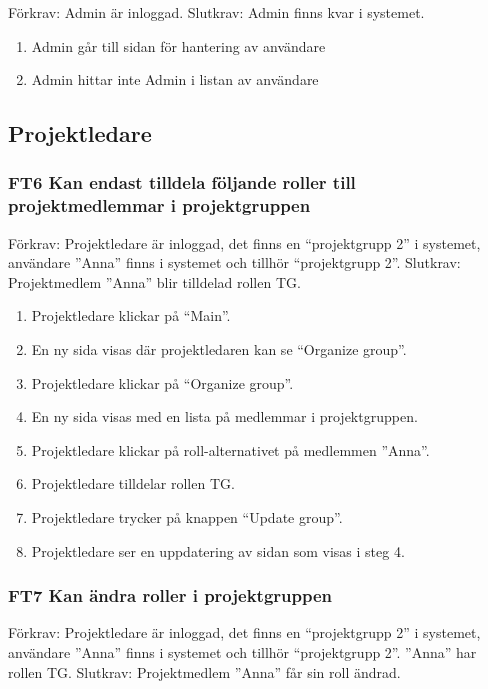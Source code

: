 \documentclass[paper=a4, fontsize=11pt,twoside]{article}
\begin{document}
	Förkrav: Admin är inloggad.
	\newline
	Slutkrav: Admin finns kvar i systemet.
	
	\begin{enumerate}
	\item Admin går till sidan för hantering av användare
 	\item Admin hittar inte Admin i listan av användare
 	\end{enumerate}
	
	
	\subsection{Projektledare}
	
	\subsubsection*{FT6 Kan endast tilldela följande roller till projektmedlemmar i
	projektgruppen }
	
	Förkrav: Projektledare är inloggad, det finns en “projektgrupp 2” i systemet,
	användare  ”Anna” finns i systemet och tillhör “projektgrupp 2”.
	\newline
	Slutkrav: Projektmedlem ”Anna” blir tilldelad  rollen TG.
	
	\begin{enumerate}
	 \item Projektledare klickar på “Main”.
	\item En ny sida visas där projektledaren kan se “Organize group”.
	\item Projektledare klickar på “Organize group”.
	\item En ny sida visas med en lista på medlemmar i projektgruppen.
	\item Projektledare klickar på roll-alternativet på medlemmen ”Anna”.
	\item Projektledare tilldelar rollen TG.
	\item Projektledare trycker på knappen “Update group”.
	\item Projektledare ser en uppdatering av sidan som visas i steg 4. 
	  
	\end{enumerate}

	\subsubsection*{FT7 Kan ändra roller i projektgruppen }
	
	Förkrav: Projektledare är inloggad, det finns en “projektgrupp 2” i systemet,
	användare  ”Anna” finns i systemet och tillhör “projektgrupp 2”. ”Anna” har rollen TG.
	\newline
	Slutkrav: Projektmedlem ”Anna” får sin roll ändrad.
	
\end{document}
